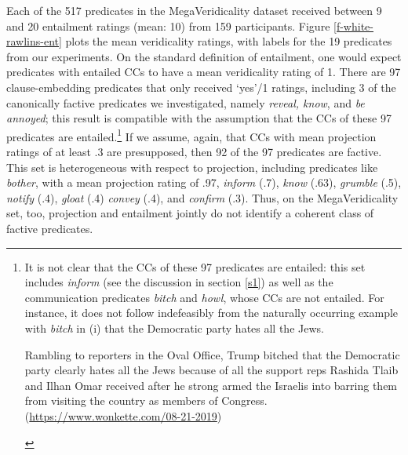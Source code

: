 \documentclass{language}
\newcommand{\6}{\mbox{$[\hspace*{-.6mm}[$}}
\newcommand{\9}{\mbox{$]\hspace*{-.6mm}]$}}
\begin{document}
Each of the 517 predicates in the MegaVeridicality dataset received between 9 and 20 entailment ratings (mean: 10) from 159 participants. Figure \ref{f-white-rawlins-ent} plots the mean veridicality ratings, with labels for the 19 predicates from our experiments. On the standard definition of entailment, one would expect predicates with entailed CCs to have a mean veridicality rating of 1. There are 97 clause-embedding predicates that only received `yes'/1 ratings, including 3 of the canonically factive predicates we investigated, namely {\em reveal, know}, and {\em be annoyed}; this result is compatible with the assumption that the CCs of these 97 predicates are entailed.\footnote{\label{mv}It is not clear that the CCs of these 97 predicates are entailed: this set includes {\em inform} (see the discussion in section \ref{s1}) as well as the communication predicates {\em bitch} and {\em howl}, whose CCs are not entailed. 
For instance, it does not follow indefeasibly from the naturally occurring example with {\em bitch} in (i) that the Democratic party hates all the Jews.
\begin{exe}
 Rambling to reporters in the Oval Office, Trump bitched that the Democratic party clearly hates all the Jews because of all the support reps Rashida Tlaib and Ilhan Omar received after he strong armed the Israelis into barring them from visiting the country as members of Congress. (\url{https://www.wonkette.com/08-21-2019})
\end{exe}
}
If we assume, again, that CCs with mean projection ratings of at least .3 are presupposed, then 92 of the 97 predicates are factive. This set is heterogeneous with respect to projection, including predicates like {\em bother}, with a mean projection rating of .97, {\em inform} (.7), {\em know} (.63), {\em grumble} (.5), {\em notify} (.4), {\em gloat} (.4) {\em convey} (.4), and {\em confirm} (.3). Thus, on the MegaVeridicality set, too, projection and entailment jointly do not identify a coherent class of factive predicates.
\end{document}
